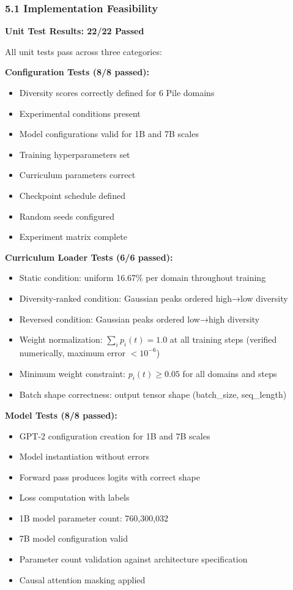 
\subsubsection{5.1 Implementation Feasibility}

\textbf{Unit Test Results: 22/22 Passed}

All unit tests pass across three categories:

\textbf{Configuration Tests (8/8 passed):}
\begin{itemize}
\item Diversity scores correctly defined for 6 Pile domains
\item Experimental conditions present
\item Model configurations valid for 1B and 7B scales
\item Training hyperparameters set
\item Curriculum parameters correct
\item Checkpoint schedule defined
\item Random seeds configured
\item Experiment matrix complete
\end{itemize}

\textbf{Curriculum Loader Tests (6/6 passed):}
\begin{itemize}
\item Static condition: uniform 16.67\% per domain throughout training
\item Diversity-ranked condition: Gaussian peaks ordered high→low diversity
\item Reversed condition: Gaussian peaks ordered low→high diversity
\item Weight normalization: $\sum_i p_i(t) = 1.0$ at all training steps (verified numerically, maximum error $<10^{-6}$)
\item Minimum weight constraint: $p_i(t) \geq 0.05$ for all domains and steps
\item Batch shape correctness: output tensor shape (batch_size, seq_length)
\end{itemize}

\textbf{Model Tests (8/8 passed):}
\begin{itemize}
\item GPT-2 configuration creation for 1B and 7B scales
\item Model instantiation without errors
\item Forward pass produces logits with correct shape
\item Loss computation with labels
\item 1B model parameter count: 760,300,032
\item 7B model configuration valid
\item Parameter count validation against architecture specification
\item Causal attention masking applied
\end{itemize}

